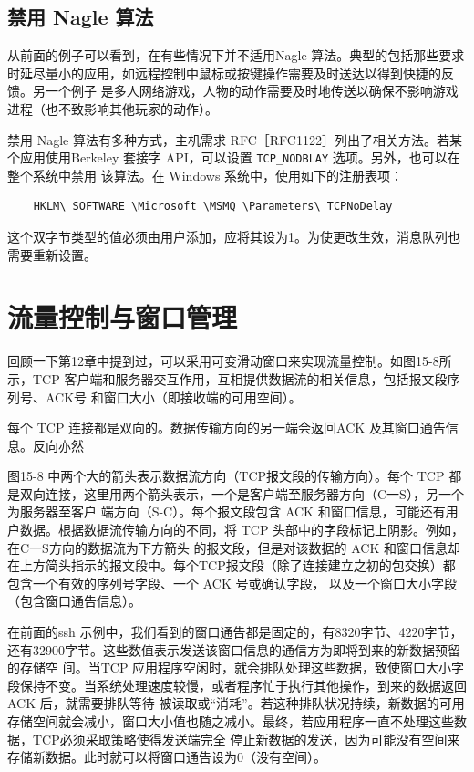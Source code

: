 \subsection{禁用 Nagle 算法}
从前面的例子可以看到，在有些情况下并不适用Nagle 算法。典型的包括那些要求时延尽量小的应用，如远程控制中鼠标或按键操作需要及时送达以得到快捷的反馈。另一个例子
是多人网络游戏，人物的动作需要及时地传送以确保不影响游戏进程（也不致影响其他玩家的动作）。

禁用 Nagle 算法有多种方式，主机需求 RFC［RFC1122］列出了相关方法。若某个应用使用Berkeley 套接字 API，可以设置 \verb|TCP_NODBLAY| 选项。另外，也可以在整个系统中禁用
该算法。在 Windows 系统中，使用如下的注册表项：
\begin{verbatim}
    HKLM\ SOFTWARE \Microsoft \MSMQ \Parameters\ TCPNoDelay
\end{verbatim}
这个双字节类型的值必须由用户添加，应将其设为1。为使更改生效，消息队列也需要重新设置。

\section{流量控制与窗口管理}
回顾一下第12章中提到过，可以采用可变滑动窗口来实现流量控制。如图15-8所示，TCP 客户端和服务器交互作用，互相提供数据流的相关信息，包括报文段序列号、ACK号
和窗口大小（即接收端的可用空间）。

每个 TCP 连接都是双向的。数据传输方向的另一端会返回ACK 及其窗口通告信息。反向亦然

图15-8 中两个大的箭头表示数据流方向（TCP报文段的传输方向）。每个 TCP 都是双向连接，这里用两个箭头表示，一个是客户端至服务器方向（C一S），另一个为服务器至客户
端方向（S-C）。每个报文段包含 ACK 和窗口信息，可能还有用户数据。根据数据流传输方向的不同，将 TCP 头部中的字段标记上阴影。例如，在C一S方向的数据流为下方箭头
的报文段，但是对该数据的 ACK 和窗口信息却在上方简头指示的报文段中。每个TCP报文段（除了连接建立之初的包交换）都包含一个有效的序列号字段、一个 ACK 号或确认字段，
以及一个窗口大小字段（包含窗口通告信息）。

在前面的ssh 示例中，我们看到的窗口通告都是固定的，有8320字节、4220字节，还有32900字节。这些数值表示发送该窗口信息的通信方为即将到来的新数据预留的存储空
间。当TCP 应用程序空闲时，就会排队处理这些数据，致使窗口大小字段保持不变。当系统处理速度较慢，或者程序忙于执行其他操作，到来的数据返回ACK 后，就需要排队等待
被读取或“消耗”。若这种排队状况持续，新数据的可用存储空间就会减小，窗口大小值也随之减小。最终，若应用程序一直不处理这些数据，TCP必须采取策略使得发送端完全
停止新数据的发送，因为可能没有空间来存储新数据。此时就可以将窗口通告设为0（没有空间）。

